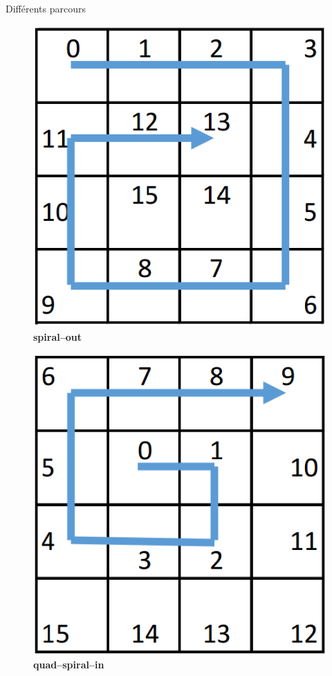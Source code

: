 \begin{frame}[plain]{Différents parcours}
\begin{figure}[H]
				\includegraphics[width=\linewidth]{images/parcours_spiral-in.png}
				\endminipage\hfill
				\textbf{spiral--out}
				
				\includegraphics[width=\linewidth]{images/parcours_spiral-out.png}
				\endminipage\hfill
				\textbf{quad--spiral--in}
				

\end{figure}
\end{frame}

